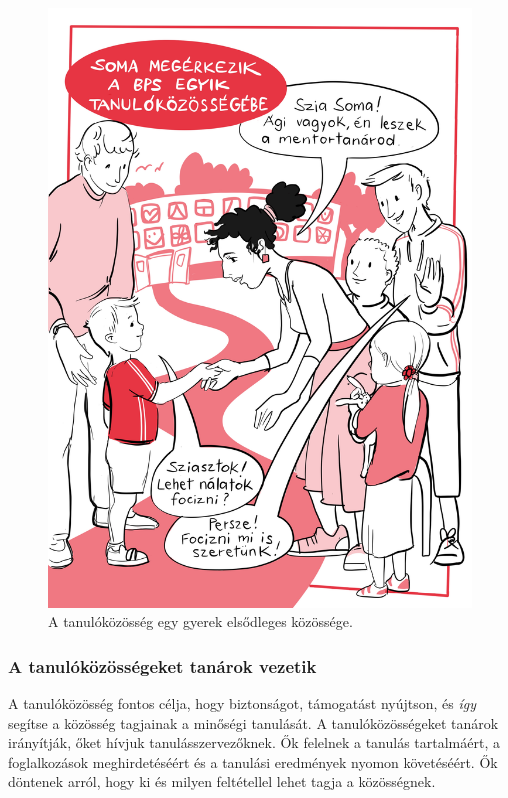 \begin{figure}
\centering
\includegraphics{pics/1a_mikroisk_soma.jpg}
\caption{A tanulóközösség egy gyerek elsődleges közössége.}
\end{figure}

\hypertarget{a-tanulokozossegeket-tanarok-vezetik}{%
\subsubsection{A tanulóközösségeket tanárok
vezetik}\label{a-tanulokozossegeket-tanarok-vezetik}}

A tanulóközösség fontos célja, hogy biztonságot, támogatást nyújtson, és
\emph{így} segítse a közösség tagjainak a minőségi tanulását. A
tanulóközösségeket tanárok irányítják, őket hívjuk tanulásszervezőknek.
Ők felelnek a tanulás tartalmáért, a foglalkozások meghirdetéséért és a
tanulási eredmények nyomon követéséért. Ők döntenek arról, hogy ki és
milyen feltétellel lehet tagja a közösségnek.

